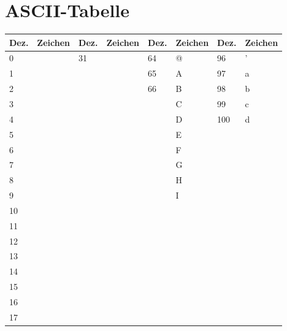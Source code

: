 \section{ASCII-Tabelle}
\begin{table}[htp]
    \centering
    \begin{tabular}{|l|l||l|l||l|l||l|l|}
    \hline
    \textbf{Dez.} & \textbf{Zeichen} & \textbf{Dez.} & \textbf{Zeichen} & \textbf{Dez.} & \textbf{Zeichen} & \textbf{Dez.} & \textbf{Zeichen} \\ \hline\hline
    0    & ~       & 31   & ~       & 64   & @       & 96   & '       \\ \hline
    1    & ~       & ~    & ~       & 65   & A       & 97   & a       \\ \hline
    2    & ~       & ~    & ~       & 66   & B       & 98   & b       \\ \hline
    3    & ~       & ~    & ~       & ~    & C       & 99   & c       \\ \hline
    4    & ~       & ~    & ~       & ~    & D       & 100  & d       \\ \hline
    5    & ~       & ~    & ~       & ~    & E       & ~    & ~       \\ \hline
    6    & ~       & ~    & ~       & ~    & F       & ~    & ~       \\ \hline
    7    & ~       & ~    & ~       & ~    & G       & ~    & ~       \\ \hline
    8    & ~       & ~    & ~       & ~    & H       & ~    & ~       \\ \hline
    9    & ~       & ~    & ~       & ~    & I       & ~    & ~       \\ \hline
    10   & ~       & ~    & ~       & ~    & ~       & ~    & ~       \\ \hline
    11   & ~       & ~    & ~       & ~    & ~       & ~    & ~       \\ \hline
    12   & ~       & ~    & ~       & ~    & ~       & ~    & ~       \\ \hline
    13   & ~       & ~    & ~       & ~    & ~       & ~    & ~       \\ \hline
    14   & ~       & ~    & ~       & ~    & ~       & ~    & ~       \\ \hline
    15   & ~       & ~    & ~       & ~    & ~       & ~    & ~       \\ \hline
    16   & ~       & ~    & ~       & ~    & ~       & ~    & ~       \\ \hline
    17   & ~       & ~    & ~       & ~    & ~       & ~    & ~       \\ \hline

\end{tabular}
\end{table}
